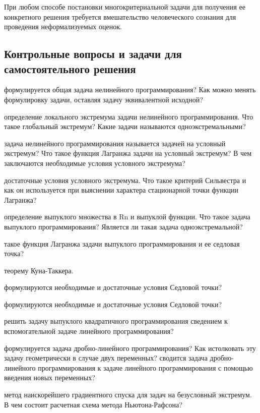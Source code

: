 {При любом способе постановки многокритериальной задачи для получения ее конкретного решения требуется вмешательство человеческого сознания для проведения неформализуемых оценок.

\subsection*{Контрольные вопросы и задачи для самостоятельного решения}

\begin{enumerate}
 формулируется общая задача нелинейного программирования? Как можно менять формулировку задачи, оставляя задачу эквивалентной исходной?

 определение локального экстремума задачи нелинейного программирования. Что такое глобальный экстремум? Какие задачи называются одноэкстремальными?

 задача нелинейного программирования называется задачей на условный экстремум? Что такое функция Лагранжа задачи на условный экстремум? В чем заключаются необходимые условия условного экстремума?

 достаточные условия условного экстремума. Что такое критерий Сильвестра и как он используется при выяснении характера стационарной точки функции Лагранжа?

 определение выпуклого множества в Rn и выпуклой функции. Что такое задача выпуклого программирования? Является ли такая задача одноэкстремальной?

 такое функция Лагранжа задачи выпуклого программирования и ее седловая точка?

 теорему Куна-Таккера.

 формулируются необходимые и достаточные условия Седловой точки?

 формулируются необходимые и достаточные условия Седловой точки?

 решить задачу выпуклого квадратичного программирования сведением к вспомогательной задаче линейного программирования?

 формулируется задача дробно-линейного программирования? Как истолковать эту задачу геометрически в случае двух переменных?
 сводится задача дробно-линейного программирования к задаче линейного программирования с помощью введения новых переменных?

 метод наискорейшего градиентного спуска для задач на безусловный экстремум. В чем состоит расчетная схема метода Ньютона-Рафсона?


\end{enumerate}}
